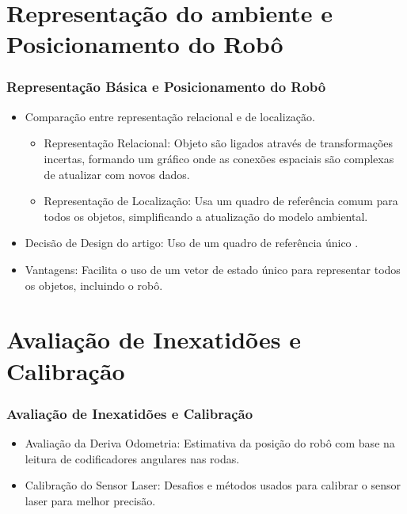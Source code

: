 \documentclass[xcolor=dvipsnames, aspectratio=169]{beamer}
\begin{document}
\section{Representação do ambiente e Posicionamento do Robô}
  \begin{frame}
  \frametitle{Representação Básica e Posicionamento do Robô}
  \begin{itemize}
      \item Comparação entre representação relacional e de localização.
      \begin{itemize}
        \item Representação Relacional: Objeto são ligados através de transformações incertas, formando um gráfico onde as conexões espaciais são complexas de atualizar com novos dados.
        \item Representação de Localização: Usa um quadro de referência comum para todos os objetos, simplificando a atualização do modelo ambiental.
      \end{itemize}
      \item Decisão de Design do artigo: Uso de um quadro de referência único \cite{moutarlier2006experimental}.
      \item Vantagens: Facilita o uso de um vetor de estado único para representar todos os objetos, incluindo o robô.
  \end{itemize}
\end{frame}
  

\section{Avaliação de Inexatidões e Calibração}
  \begin{frame}
  \frametitle{Avaliação de Inexatidões e Calibração}
  \begin{itemize}
      \item Avaliação da Deriva Odometria: Estimativa da posição do robô com base na leitura de codificadores angulares nas rodas.
      \item Calibração do Sensor Laser: Desafios e métodos usados para calibrar o sensor laser para melhor precisão.
  \end{itemize}
\end{frame}
  

\end{document}
